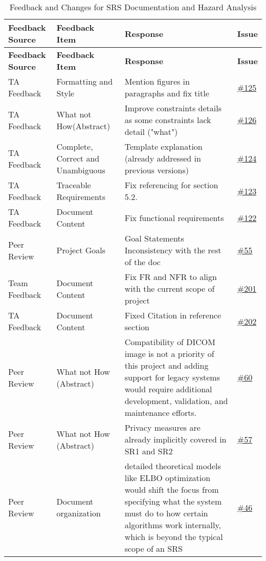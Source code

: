 \documentclass{article}
\begin{document}
\begin{longtable}{| p{} | p{} | p{} | p{} |}
    \caption{Feedback and Changes for SRS Documentation and Hazard Analysis} \\
    \hline
    \textbf{Feedback Source} & \textbf{Feedback Item} & \textbf{Response} & \textbf{Issue} \\
    \hline
    \endfirsthead
    \hline
    \textbf{Feedback Source} & \textbf{Feedback Item} & \textbf{Response} & \textbf{Issue} \\
    \hline
    \endhead
    \hline
    \endfoot
    TA Feedback & Formatting and Style & Mention figures in paragraphs and fix title & \href{https://github.com/RezaJodeiri/CXR-Capstone/issues/125}{\#125}\\
    \hline
    TA Feedback & What not How(Abstract) & Improve constraints details as some constraints lack detail ("what") & \href{https://github.com/RezaJodeiri/CXR-Capstone/issues/126}{\#126} \\
    \hline
    TA Feedback & Complete, Correct and Unambiguous & Template explanation (already addressed in previous versions) & \href{https://github.com/RezaJodeiri/CXR-Capstone/issues/124}{\#124}\\
    \hline
    TA Feedback & Traceable Requirements & Fix referencing for section 5.2. & \href{https://github.com/RezaJodeiri/CXR-Capstone/issues/123}{\#123} \\
    \hline
    TA Feedback & Document Content & Fix functional requirements & \href{https://github.com/RezaJodeiri/CXR-Capstone/issues/122}{\#122} \\
    \hline
    Peer Review & Project Goals & Goal Statements Inconsistency with the rest of the doc & \href{https://github.com/RezaJodeiri/CXR-Capstone/issues/55}{\#55} \\
    \hline
    Team Feedback & Document Content & Fix FR and NFR to align with the current scope of project & \href{https://github.com/RezaJodeiri/CXR-Capstone/issues/201}{\#201}\\
    \hline
    TA Feedback & Document Content & Fixed Citation in reference section  & \href{https://github.com/RezaJodeiri/CXR-Capstone/issues/202}{\#202}\\
    \hline
    Peer Review & What not How (Abstract) & Compatibility of DICOM image is not a priority of this project and adding support for legacy systems would require additional development, validation, and maintenance efforts. & \href{https://github.com/RezaJodeiri/CXR-Capstone/issues/60}{\#60}\\
    \hline
    Peer Review & What not How (Abstract) & Privacy measures are already implicitly covered in SR1 and SR2  & \href{https://github.com/RezaJodeiri/CXR-Capstone/issues/57}{\#57} \\
    Peer Review & Document organization & detailed theoretical models like ELBO optimization would shift the focus from specifying what the system must do to how certain algorithms work internally, which is beyond the typical scope of an SRS  & \href{https://github.com/RezaJodeiri/CXR-Capstone/issues/46}{\#46} \\
    

\end{longtable}
\end{document}
